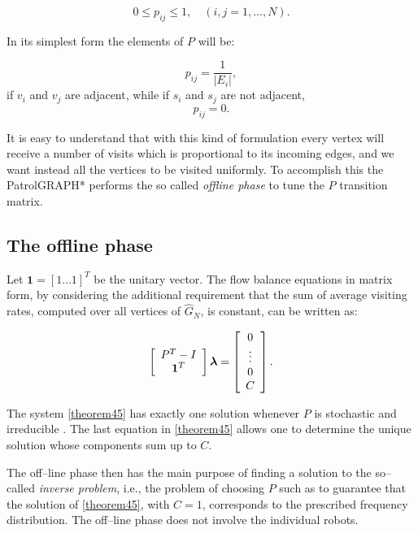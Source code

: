 \begin{equation}
0 \leq p_{ij} \leq 1,\quad (i,j=1,\ldots,N). 
\label{Pmatrix3c}
\end{equation}
 
   In its simplest form the elements of $P$ will be:

\begin{equation}
p_{ij}=\frac{1}{|E_i|},
\label{eq_adj}
\end{equation}
if $v_i$ and $v_j$ are adjacent, while if $s_i$ and $s_j$ are not adjacent,
\begin{equation}
p_{ij}=0.
\label{eq_noadj}
\end{equation}

It is easy to understand that with this kind of formulation every vertex will receive a number of visits which is proportional to its incoming edges, and we want instead all the vertices to be visited uniformly. To accomplish this the PatrolGRAPH* performs the so called \emph{offline phase} to tune the $P$ transition matrix.

\subsection{The offline phase}


Let $\bm{1}=[1 \ldots 1]^T$ be the unitary vector. The flow balance equations in matrix form, by considering the additional requirement that the sum of average visiting rates, computed over all vertices of $\hat{G}_N$, is constant, can be written as:

\begin{equation}
\left[\begin{array}{*{20}c} {P^T - I} \\ {\bm 1^T} \end{array} \right] \bm \lambda = \left[\begin{array}{*{20}c} {0} \\ \vdots \\ {0} \\ {C} \end{array}\right].
\label{theorem45}
\end{equation}

The system \eqref{theorem45} has exactly one solution whenever $P$ is stochastic and irreducible \cite{5711675}. The last equation in \eqref{theorem45} allows one to determine the unique solution whose components sum up to $C$.

The off--line phase then has the main purpose of finding a solution to the so--called \emph{inverse problem}, i.e., the problem of choosing $P$ such as to guarantee that the solution of \eqref{theorem45}, with $C=1$, corresponds to the prescribed frequency distribution. The off--line phase does not involve the individual robots.

